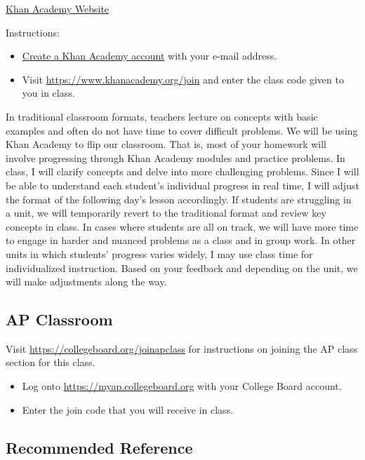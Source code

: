 \documentclass[12pt,fleqn]{article}
\begin{document}
\href{https://www.khanacademy.org/}{Khan Academy Website}

Instructions:

\begin{itemize}
\item
  \href{https://www.khanacademy.org/signup}{Create a Khan Academy account} with your e-mail address.
\item
  Visit \url{https://www.khanacademy.org/join} and enter the class code given to you in class.
\end{itemize}

In traditional classroom formats, teachers lecture on concepts with basic examples and often do not have time to cover difficult problems. We will be using Khan Academy to flip our classroom. That is, most of your homework will involve progressing through Khan Academy modules and practice problems. In class, I will clarify concepts and delve into more challenging problems. Since I will be able to understand each student's individual progress in real time, I will adjust the format of the following day's lesson accordingly. If students are struggling in a unit, we will temporarily revert to the traditional format and review key concepts in class. In cases where students are all on track, we will have more time to engage in harder and nuanced problems as a class and in group work. In other units in which students' progress varies widely, I may use class time for individualized instruction. Based on your feedback and depending on the unit, we will make adjustments along the way.

\hypertarget{ap-classroom}{%
\subsection{AP Classroom}\label{ap-classroom}}

Visit \url{https://collegeboard.org/joinapclass} for instructions on joining the AP class section for this class.

\begin{itemize}
\item
  Log onto \url{https://myap.collegeboard.org} with your College Board account.
\item
  Enter the join code that you will receive in class.
\end{itemize}

\hypertarget{recommended-reference}{%
\subsection{Recommended Reference}\label{recommended-reference}}
\end{document}
